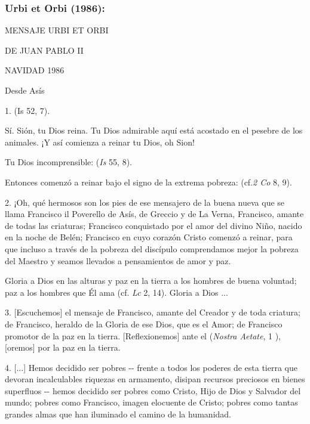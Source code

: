\begin{body}
	\subsubsection{Urbi et Orbi (1986): }
	
	MENSAJE URBI ET ORBI
	
	DE JUAN PABLO II
	
	NAVIDAD 1986
	
	Desde Asís
	
	\begin{body}
		1.  (Is 52, 7).
		
		Sí. Sión, tu Dios reina. Tu Dios admirable aquí está acostado en el pesebre de los animales. ¡Y así comienza a reinar tu Dios, oh Sion!
		
		Tu Dios incomprensible:  (\emph{Is} 55, 8).
		
		Entonces comenzó a reinar bajo el signo de la extrema pobreza:  (cf.\emph{2 Co} 8, 9).
		
		2. ¡Oh, qué hermosos son los pies de ese mensajero de la buena nueva que se llama Francisco il Poverello de Asís, de Greccio y de La Verna, Francisco, amante de todas las criaturas; Francisco conquistado por el amor del divino Niño, nacido en la noche de Belén; Francisco en cuyo corazón Cristo comenzó a reinar, para que incluso a través de la pobreza del discípulo comprendamos mejor la pobreza del Maestro y seamos llevados a pensamientos de amor y paz.
		
		Gloria a Dios en las alturas y paz en la tierra a los hombres de buena voluntad; paz a los hombres que Él ama (cf. \emph{Lc} 2, 14). Gloria a Dios ...
		
		3. {[}Escuchemos{]} el mensaje de Francisco, amante del Creador y de toda criatura; de Francisco, heraldo de la Gloria de ese Dios, que  es el Amor; de Francisco promotor de la paz en la tierra. {[}Reflexionemos{]} ante el  ({\emph{Nostra Aetate}}, 1 ), {[}oremos{]} por la paz en la tierra.
		
		4. {[}...{]} Hemos decidido ser pobres -\/- frente a todos los poderes de esta tierra que devoran incalculables riquezas en armamento, disipan recursos preciosos en bienes superfluos -\/- hemos decidido ser pobres como Cristo, Hijo de Dios y Salvador del mundo; pobres como Francisco, imagen elocuente de Cristo; pobres como tantas grandes almas que han iluminado el camino de la humanidad.
		

\end{body}
\end{body}
